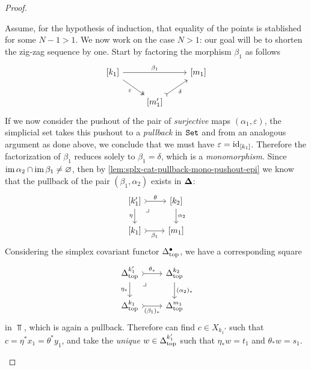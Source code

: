 \begin{proof}
\begin{itemize}
  Assume, for the hypothesis of induction, that equality of the points is
  stablished for some \(N-1 > 1\). We now work on the case \(N > 1\): our goal
  will be to shorten the zig-zag sequence by one. Start by factoring the
  morphism \(\beta_1\) as follows
  \[
  \begin{tikzcd}
  {[k_1]} \ar[rr, "\beta_1"] \ar[rd, two heads, "\varepsilon"']
  & &{[m_1]} \\
  &{[m_1']} \ar[ur, tail, "\delta"'] &
  \end{tikzcd}
  \]
  If we now consider the pushout of the pair of \emph{surjective} maps
  \((\alpha_1, \varepsilon)\), the simplicial set takes this pushout to a
  \emph{pullback} in \({\texttt{Set}}\) and from an analogous argument as done above, we
  conclude that we must have \(\varepsilon = \operatorname{id}_{[k_1]}\). Therefore the
  factorization of \(\beta_1\) reduces solely to \(\beta_1 = \delta\), which is
  a \emph{monomorphism}. Since \(\operatorname{im} \alpha_2 \cap \operatorname{im} \beta_1 \neq \varnothing\),
  then by \cref{lem:splx-cat-pullback-mono-pushout-epi} we know that the
  pullback of the pair \((\beta_1, \alpha_2)\) exists in \({\mathbf{\Delta}}\):
  \begin{equation}\label{eq:pullback-unique-nd-pt-xi}
  \begin{tikzcd}
  {[k_1']} \ar[r, tail, "\theta"]
  \ar[rd, phantom, very near start, "\lrcorner"]
  \ar[d, "\eta"']
  &{[k_2]} \ar[d, "\alpha_2"] \\
  {[k_1]} \ar[r, tail, "\beta_1"'] &{[m_1]}
  \end{tikzcd}
  \end{equation}
  Considering the simplex covariant functor \(\Delta_{\text{top}}^{\bullet}\), we have a
  corresponding square
  \[
  \begin{tikzcd}
  \splxtop^{k_1'} \ar[r, tail, "\theta_{*}"]
  \ar[d, "\eta_{*}"']
  \ar[rd, phantom, very near start, "\lrcorner"]
  &\splxtop^{k_2} \ar[d, "(\alpha_2)_{*}"] \\
  \splxtop^{k_1} \ar[r, tail, "(\beta_1)_{*}"'] &\splxtop^{m_1}
  \end{tikzcd}
  \]
  in \(\Top\), which is again a pullback.
  Therefore can find \(c \in X_{k_1'}\) such that
  \(c = \eta^{*} x_1 = \theta^{*} y_1\), and take the \emph{unique}
  \(w \in \Delta_{\text{top}}^{k_1'}\) such that \(\eta_{*} w = t_1\) and
  \(\theta_{*} w = s_1\).


\end{itemize}
\end{proof}
